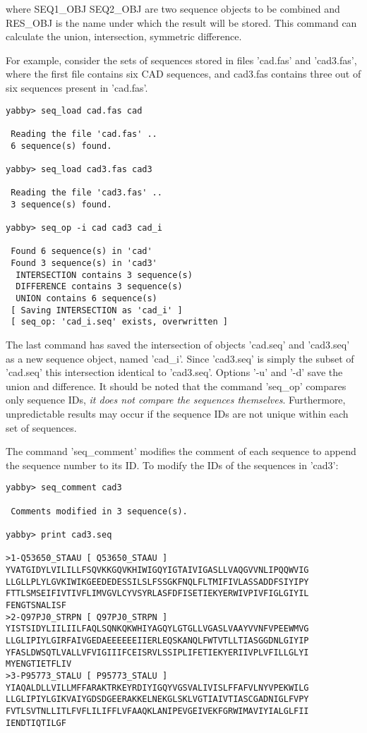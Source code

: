 where SEQ1\_OBJ SEQ2\_OBJ are two sequence objects to be combined 
and RES\_OBJ is the name under which the result will be stored.
This command can calculate the union, intersection, symmetric
difference.

For example, consider the sets of sequences stored in files
'cad.fas' and 'cad3.fas', where the first file contains six 
CAD sequences, and cad3.fas contains three out of six sequences
present in 'cad.fas'.

\begin{verbatim}
yabby> seq_load cad.fas cad

 Reading the file 'cad.fas' ..
 6 sequence(s) found.

yabby> seq_load cad3.fas cad3

 Reading the file 'cad3.fas' ..
 3 sequence(s) found.

yabby> seq_op -i cad cad3 cad_i

 Found 6 sequence(s) in 'cad'
 Found 3 sequence(s) in 'cad3'
  INTERSECTION contains 3 sequence(s)
  DIFFERENCE contains 3 sequence(s)
  UNION contains 6 sequence(s)
 [ Saving INTERSECTION as 'cad_i' ]
 [ seq_op: 'cad_i.seq' exists, overwritten ]
\end{verbatim}

The last command has saved the intersection of objects 'cad.seq' and
'cad3.seq' as a new sequence object, named 'cad\_i'. Since 'cad3.seq'
is simply the subset of 'cad.seq' this intersection identical to
'cad3.seq'. Options '-u' and '-d' save the union and difference.
It should be noted that the command 'seq\_op' compares only
sequence IDs, {\em it does not compare the sequences themselves}.
Furthermore, unpredictable results may occur if the sequence IDs
are not unique within each set of sequences. 


The command 'seq\_comment' modifies the comment of each sequence
to append the sequence number to its ID. To modify the IDs of the
sequences in 'cad3':

\begin{verbatim}
yabby> seq_comment cad3

 Comments modified in 3 sequence(s).

yabby> print cad3.seq

>1-Q53650_STAAU [ Q53650_STAAU ]
YVATGIDYLVILILLFSQVKKGQVKHIWIGQYIGTAIVIGASLLVAQGVVNLIPQQWVIG
LLGLLPLYLGVKIWIKGEEDEDESSILSLFSSGKFNQLFLTMIFIVLASSADDFSIYIPY
FTTLSMSEIFIVTIVFLIMVGVLCYVSYRLASFDFISETIEKYERWIVPIVFIGLGIYIL
FENGTSNALISF
>2-Q97PJ0_STRPN [ Q97PJ0_STRPN ]
YISTSIDYLIILIILFAQLSQNKQKWHIYAGQYLGTGLLVGASLVAAYVVNFVPEEWMVG
LLGLIPIYLGIRFAIVGEDAEEEEEEIIERLEQSKANQLFWTVTLLTIASGGDNLGIYIP
YFASLDWSQTLVALLVFVIGIIIFCEISRVLSSIPLIFETIEKYERIIVPLVFILLGLYI
MYENGTIETFLIV
>3-P95773_STALU [ P95773_STALU ]
YIAQALDLLVILLMFFARAKTRKEYRDIYIGQYVGSVALIVISLFFAFVLNYVPEKWILG
LLGLIPIYLGIKVAIYGDSDGEERAKKELNEKGLSKLVGTIAIVTIASCGADNIGLFVPY
FVTLSVTNLLITLFVFLILIFFLVFAAQKLANIPEVGEIVEKFGRWIMAVIYIALGLFII
IENDTIQTILGF
\end{verbatim}

